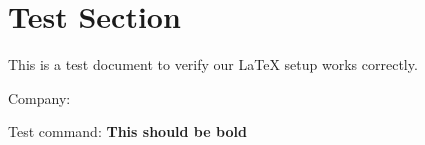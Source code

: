 \documentclass[11pt,letterpaper]{article}
\newcommand{\testcommand}[1]{\textbf{#1}}
\begin{document}
\title{\DocumentTitle}
\author{\DocumentAuthor}
\date{\DocumentDate}
\maketitle

\section{Test Section}

This is a test document to verify our LaTeX setup works correctly.

Company: \CompanyName

Test command: \testcommand{This should be bold}
\end{document}
